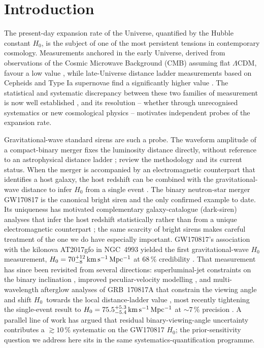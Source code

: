 \documentclass[usenatbib]{mnras}
\newcommand{\kmsmpc}{\ensuremath{\,\rm km\,s^{-1}\,Mpc^{-1}}\xspace}
\newcommand{\hzero}{\ensuremath{H_{0}}\xspace}
\begin{document}
\section{Introduction}
\label{sec:introduction}

The present-day expansion rate of the Universe, quantified by the Hubble constant \hzero, is the subject of one of the most persistent tensions in contemporary cosmology. Measurements anchored in the early Universe, derived from observations of the Cosmic Microwave Background (CMB) assuming flat $\Lambda$CDM, favour a low value \citep{Planck2020}, while late-Universe distance ladder measurements based on Cepheids and Type Ia supernovae find a significantly higher value \citep{Riess2016,Riess2022}. The statistical and systematic discrepancy between these two families of measurement is now well established \citep{DiValentino2021HubbleReview}, and its resolution -- whether through unrecognised systematics or new cosmological physics -- motivates independent probes of the expansion rate.

Gravitational-wave standard sirens are such a probe. The waveform amplitude of a compact-binary merger fixes the luminosity distance directly, without reference to an astrophysical distance ladder \citep{Schutz1986}; \citet{PalmeseMastrogiovanni2025} review the methodology and its current status. When the merger is accompanied by an electromagnetic counterpart that identifies a host galaxy, the host redshift can be combined with the gravitational-wave distance to infer \hzero from a single event \citep{HolzHughes2005}. The binary neutron-star merger GW170817 \citep{Abbott2017GW170817Discovery} is the canonical bright siren and the only confirmed example to date. Its uniqueness has motivated complementary galaxy-catalogue (dark-siren) analyses that infer the host redshift statistically rather than from a unique electromagnetic counterpart \citep{LVK2026GWTC5Cosmology}; the same scarcity of bright sirens makes careful treatment of the one we do have especially important. GW170817's association with the kilonova AT2017gfo in NGC~4993 yielded the first gravitational-wave \hzero measurement, $\hzero=70_{-8}^{+12}\kmsmpc$ at $68\,\%$ credibility \citep{Abbott2017H0}. That measurement has since been revisited from several directions: superluminal-jet constraints on the binary inclination \citep{Mooley2018Nature,Hotokezaka2019}, improved peculiar-velocity modelling \citep{Nicolaou2020,Mukherjee2021Velocity,HowlettDavis2020}, and multi-wavelength afterglow analyses of GRB~170817A that constrain the viewing angle and shift \hzero\ towards the local distance-ladder value \citep{Wang2023GW170817H0}, most recently tightening the single-event result to $\hzero=75.5_{-5.4}^{+5.3}\kmsmpc$ at $\sim 7\,\%$ precision \citep{Palmese2024GW170817H0}. A parallel line of work has argued that residual binary-viewing-angle uncertainty contributes a $\gtrsim 10\,\%$ systematic on the GW170817 \hzero \citep{SalvareseChen2024}; the prior-sensitivity question we address here sits in the same systematics-quantification programme.
\end{document}

